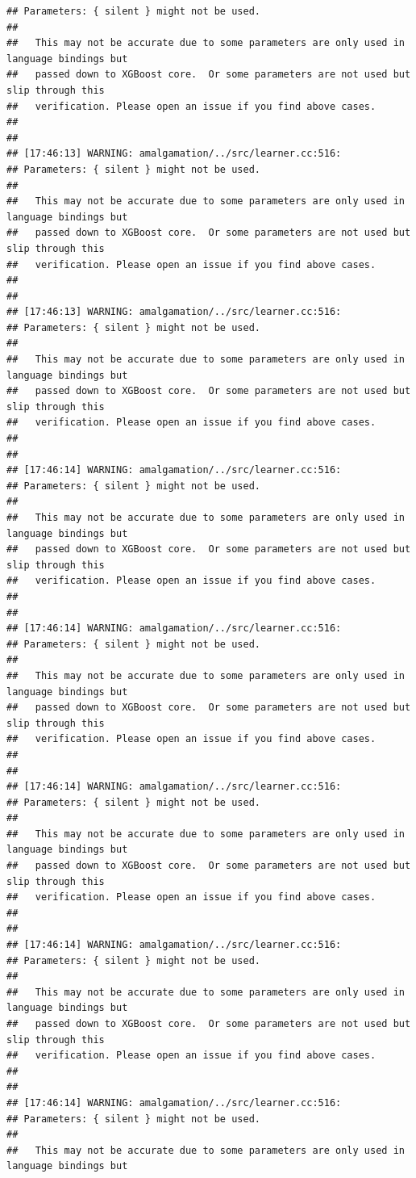 \documentclass[AMS,STIX2COL]{WileyNJD-v2}\usepackage[]{graphicx}\usepackage[]{color}
\makeatletter
\newenvironment{kframe}{%
 \def\at@end@of@kframe{}%
 \ifinner\ifhmode%
  \def\at@end@of@kframe{\end{minipage}}%
  \begin{minipage}{\columnwidth}%
 \fi\fi%
 \def\FrameCommand##1{\hskip\@totalleftmargin \hskip-\fboxsep
 \colorbox{shadecolor}{##1}\hskip-\fboxsep
     \hskip-\linewidth \hskip-\@totalleftmargin \hskip\columnwidth}%
 \MakeFramed {\advance\hsize-\width
   \@totalleftmargin\z@ \linewidth\hsize
   \@setminipage}}%
 {\par\unskip\endMakeFramed%
 \at@end@of@kframe}
\newenvironment{knitrout}{}{} %
\makeatother
\begin{document}
\begin{knitrout}
\begin{kframe}
\begin{verbatim}
## Parameters: { silent } might not be used.
## 
##   This may not be accurate due to some parameters are only used in language bindings but
##   passed down to XGBoost core.  Or some parameters are not used but slip through this
##   verification. Please open an issue if you find above cases.
## 
## 
## [17:46:13] WARNING: amalgamation/../src/learner.cc:516: 
## Parameters: { silent } might not be used.
## 
##   This may not be accurate due to some parameters are only used in language bindings but
##   passed down to XGBoost core.  Or some parameters are not used but slip through this
##   verification. Please open an issue if you find above cases.
## 
## 
## [17:46:13] WARNING: amalgamation/../src/learner.cc:516: 
## Parameters: { silent } might not be used.
## 
##   This may not be accurate due to some parameters are only used in language bindings but
##   passed down to XGBoost core.  Or some parameters are not used but slip through this
##   verification. Please open an issue if you find above cases.
## 
## 
## [17:46:14] WARNING: amalgamation/../src/learner.cc:516: 
## Parameters: { silent } might not be used.
## 
##   This may not be accurate due to some parameters are only used in language bindings but
##   passed down to XGBoost core.  Or some parameters are not used but slip through this
##   verification. Please open an issue if you find above cases.
## 
## 
## [17:46:14] WARNING: amalgamation/../src/learner.cc:516: 
## Parameters: { silent } might not be used.
## 
##   This may not be accurate due to some parameters are only used in language bindings but
##   passed down to XGBoost core.  Or some parameters are not used but slip through this
##   verification. Please open an issue if you find above cases.
## 
## 
## [17:46:14] WARNING: amalgamation/../src/learner.cc:516: 
## Parameters: { silent } might not be used.
## 
##   This may not be accurate due to some parameters are only used in language bindings but
##   passed down to XGBoost core.  Or some parameters are not used but slip through this
##   verification. Please open an issue if you find above cases.
## 
## 
## [17:46:14] WARNING: amalgamation/../src/learner.cc:516: 
## Parameters: { silent } might not be used.
## 
##   This may not be accurate due to some parameters are only used in language bindings but
##   passed down to XGBoost core.  Or some parameters are not used but slip through this
##   verification. Please open an issue if you find above cases.
## 
## 
## [17:46:14] WARNING: amalgamation/../src/learner.cc:516: 
## Parameters: { silent } might not be used.
## 
##   This may not be accurate due to some parameters are only used in language bindings but

\end{verbatim}
\end{kframe}
\end{knitrout}
\end{document}
